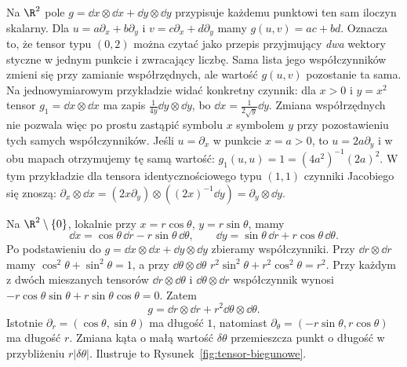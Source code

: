\begin{przyklad}
Na $\R^2$ pole
$g=\dd x\otimes\dd x+\dd y\otimes\dd y$
przypisuje każdemu punktowi ten sam iloczyn skalarny.
Dla $u=a\partial_x+b\partial_y$ i
$v=c\partial_x+d\partial_y$ mamy
$g(u,v)=ac+bd$. Oznacza to, że tensor typu $(0,2)$
można czytać jako przepis przyjmujący \emph{dwa}
wektory styczne w jednym punkcie i zwracający liczbę.
Sama lista jego współczynników zmieni się przy zamianie
współrzędnych, ale wartość $g(u,v)$ pozostanie ta sama.
Na jednowymiarowym przykładzie widać konkretny czynnik:
dla $x>0$ i $y=x^2$ tensor $g_1=\dd x\otimes\dd x$ ma zapis
$\frac1{4y}\dd y\otimes\dd y$, bo
$\dd x=\frac1{2\sqrt y}\dd y$. Zmiana współrzędnych nie
pozwala więc po prostu zastąpić symbolu $x$ symbolem $y$
przy pozostawieniu tych samych współczynników.
Jeśli $u=\partial_x$ w punkcie $x=a>0$, to
$u=2a\partial_y$ i w obu mapach otrzymujemy tę samą
wartość: $g_1(u,u)=1=(4a^2)^{-1}(2a)^2$.
W tym przykładzie dla tensora identycznościowego typu $(1,1)$
czynniki Jacobiego się znoszą:
$\partial_x\otimes\dd x
 =(2x\partial_y)\otimes((2x)^{-1}\dd y)
 =\partial_y\otimes\dd y$.
\end{przyklad}

\begin{przyklad}
Na $\R^2\setminus\{0\}$, lokalnie przy
$x=r\cos\theta$, $y=r\sin\theta$, mamy
\[
 \dd x=\cos\theta\,\dd r-r\sin\theta\,\dd\theta,
 \qquad
 \dd y=\sin\theta\,\dd r+r\cos\theta\,\dd\theta.
\]
Po podstawieniu do $g=\dd x\otimes\dd x+
\dd y\otimes\dd y$ zbieramy współczynniki.
Przy $\dd r\otimes\dd r$ mamy
$\cos^2\theta+\sin^2\theta=1$,
a przy $\dd\theta\otimes\dd\theta$
$r^2\sin^2\theta+r^2\cos^2\theta=r^2$.
Przy każdym z dwóch mieszanych tensorów
$\dd r\otimes\dd\theta$ i $\dd\theta\otimes\dd r$
współczynnik wynosi
$-r\cos\theta\sin\theta+r\sin\theta\cos\theta=0$.
Zatem
\[
 g=\dd r\otimes\dd r+r^2\dd\theta\otimes\dd\theta.
\]
Istotnie $\partial_r=(\cos\theta,\sin\theta)$ ma
długość $1$, natomiast
$\partial_\theta=(-r\sin\theta,r\cos\theta)$ ma
długość $r$. Zmiana kąta o małą wartość $\delta\theta$
przemieszcza punkt o długość w przybliżeniu $r|\delta\theta|$.
Ilustruje to Rysunek~\ref{fig:tensor-biegunowe}.
\end{przyklad}

